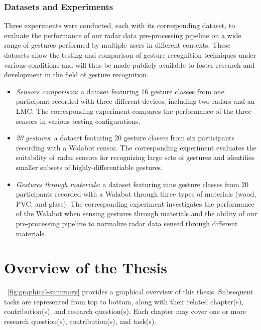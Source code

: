 \subsubsection{Datasets and Experiments}
Three experiments were conducted, each with its corresponding dataset, to evaluate the performance of our radar data pre-processing pipeline on a wide range of gestures performed by multiple users in different contexts.
These datasets allow the testing and comparison of gesture recognition techniques under various conditions and will thus be made publicly available to foster research and development in the field of gesture recognition.
\begin{itemize}
    \item \textit{Sensors comparison}: a dataset featuring 16 gesture classes from one participant recorded with three different devices, including two radars and an LMC. The corresponding experiment compares the performance of the three sensors in various testing configurations.
    \item \textit{20 gestures}: a dataset featuring 20 gesture classes from six participants recording with a Walabot sensor. The corresponding experiment evaluates the suitability of radar sensors for recognizing large sets of gestures and identifies smaller subsets of highly-differentiable gestures.
    \item \textit{Gestures through materials}: a dataset featuring nine gesture classes from 20 participants recorded with a Walabot through three types of materials (wood, PVC, and glass). The corresponding experiment investigates the performance of the Walabot when sensing gestures through materials and the ability of our pre-processing pipeline to normalize radar data sensed through different materials.
\end{itemize}


\section{Overview of the Thesis} \label{sec:introduction:overview}
\fig~\ref{fig:graphical-summary} provides a graphical overview of this thesis. Subsequent tasks are represented from top to bottom, along with their related chapter(s), contribution(s), and research question(s). Each chapter may cover one or more research question(s), contribution(s), and task(s).

